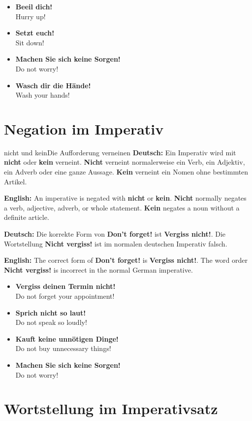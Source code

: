 \documentclass[a4paper,11pt]{article}
\newcommand{\GermanText}[1]{\textbf{Deutsch: }#1\par}
\newcommand{\EnglishText}[1]{{\small\color{SoftGray}\textbf{English: }#1\par}}
\newcommand{\ExampleItem}[2]{\item \textbf{#1}\\{\small\color{SoftGray}#2}}
\begin{document}
        \begin{exbox}
            \begin{itemize}
                \ExampleItem{Beeil dich!}{Hurry up!}
                \ExampleItem{Setzt euch!}{Sit down!}
                \ExampleItem{Machen Sie sich keine Sorgen!}{Do not worry!}
                \ExampleItem{Wasch dir die Hände!}{Wash your hands!}
            \end{itemize}
        \end{exbox}

    \section{Negation im Imperativ}

        \begin{grammarentry}{nicht und kein}{Die Aufforderung verneinen}
            \GermanText{Ein Imperativ wird mit \textbf{nicht} oder \textbf{kein} verneint. \textbf{Nicht} verneint normalerweise ein Verb, ein Adjektiv, ein Adverb oder eine ganze Aussage. \textbf{Kein} verneint ein Nomen ohne bestimmten Artikel.}
            \EnglishText{An imperative is negated with \textbf{nicht} or \textbf{kein}. \textbf{Nicht} normally negates a verb, adjective, adverb, or whole statement. \textbf{Kein} negates a noun without a definite article.}

            \GermanText{Die korrekte Form von \textbf{Don't forget!} ist \textbf{Vergiss nicht!}. Die Wortstellung \textbf{Nicht vergiss!} ist im normalen deutschen Imperativ falsch.}
            \EnglishText{The correct form of \textbf{Don't forget!} is \textbf{Vergiss nicht!}. The word order \textbf{Nicht vergiss!} is incorrect in the normal German imperative.}
        \end{grammarentry}

        \begin{exbox}
            \begin{itemize}
                \ExampleItem{Vergiss deinen Termin nicht!}{Do not forget your appointment!}
                \ExampleItem{Sprich nicht so laut!}{Do not speak so loudly!}
                \ExampleItem{Kauft keine unnötigen Dinge!}{Do not buy unnecessary things!}
                \ExampleItem{Machen Sie sich keine Sorgen!}{Do not worry!}
            \end{itemize}
        \end{exbox}

    \section{Wortstellung im Imperativsatz}
\end{document}
